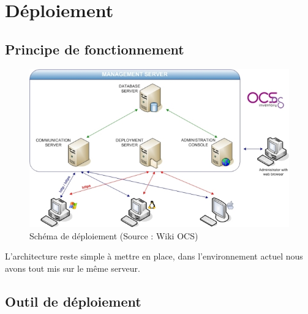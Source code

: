 \documentclass[11pt,a4paper,oneside]{article}
\begin{document}
\section{Déploiement}
\subsection{Principe de fonctionnement}
\begin{figure}[hbtp]
\includegraphics[scale=0.8]{Script/deploy.jpg}
\caption{Schéma de déploiement (Source : Wiki OCS)}
\end{figure}
L'architecture reste simple à mettre en place, dans l'environnement actuel nous avons tout mis sur le même serveur.
\subsection{Outil de déploiement}
\end{document}
